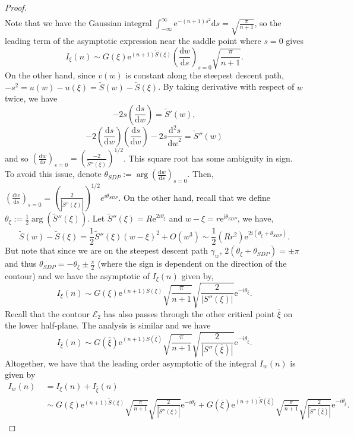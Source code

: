 \documentclass[10pt,a4paper]{amsart}
\newcommand{\ds}{{\mathrm ds}}
\newcommand{\dw}{{\mathrm dw}}
\newcommand{\tS}{{\widetilde S}}
\begin{document}
\begin{proof}
\begin{equation}
\begin{aligned}
        \end{aligned}
    \end{equation}
    Note that we have the Gaussian integral $\displaystyle \int_{-\infty}^\infty \mathrm e^{-(n+1)s^2} \ds=\sqrt{\frac{\pi}{n+1}}$, so the leading term of the asymptotic expression near the saddle point where $s=0$ gives 
    \[
    I_\xi(n) \sim G(\xi)\mathrm e^{(n+1)\tS(\xi)}\left(\frac{\mathrm dw}{\mathrm ds}\right)_{s=0} \sqrt{\frac{\pi}{n+1}}.
    \]
    On the other hand, since $v(w)$ is constant along the steepest descent path, $-s^2=u(w)-u(\xi)=\tS(w)-\tS(\xi)$. By taking derivative with respect of $w$ twice, we have 
    \[-2s\left(\frac{\ds}{\dw}\right)=\tS'(w),\]
    \[
    -2\left(\frac{\ds}{\dw}\right)\left(\frac{\ds}{\dw}\right)-2s\frac{\mathrm d^2s}{\dw^2}=\tS''(w)
    \]
    and so $\displaystyle \left(\frac{\dw}{\ds}\right)_{s=0}=\left(\frac{-2}{\tS''(\xi)}\right)^{1/2}$. 
   This square root has some ambiguity in sign. To avoid this issue, denote $\displaystyle \theta_{SDP}:=\operatorname{arg}\left(\frac{\mathrm d w}{\mathrm d s}\right)_{s=0}$. Then, 
  $ 
   \displaystyle \left(\frac{\dw}{\ds}\right)_{s=0}=\left(\frac{2}{|\tS''(\xi)|}\right)^{1/2}e^{i\theta_{SDP}}$. 
   On the other hand, recall that we define $\theta_\xi:=\frac{1}{2}\operatorname{arg}(\tS''(\xi))$. Let $\tS''(\xi)=R\mathrm e^{\mathrm 2i\theta_\xi}$ and $w-\xi=r\mathrm e^{\mathrm i \theta_{SDP}}$, we have,
   \[
     \tS(w)-\tS(\xi) = \frac{1}{2}\tS''(\xi)(w-\xi)^2 +O(w^3)\sim\frac{1}{2}(Rr^2)\mathrm e^{2i(\theta_\xi+\theta_{SDP})}.
     \]
    But note that since we are on the steepest descent path $\gamma_w$, $2(\theta_\xi+\theta_{SDP})=\pm \pi$ and thus $\theta_{SDP}=-\theta_\xi\pm\frac{\pi}{2}$ (where the sign is dependent on the direction of the contour) and we have the asymptotic of $I_\xi(n)$ given by, 
    \begin{equation}
        \label{eq: I(n) approx 3}
        I_\xi(n)\sim G(\xi)\mathrm e^{(n+1) S(\xi)}\sqrt{\frac{\pi}{n+1}}\sqrt{\frac{2}{|S''(\xi)|}}\mathrm e^{-i\theta_\xi}.
    \end{equation}
 Recall that the contour $\mathcal E_2$ has also passes through the other critical point $\bar \xi$ on the lower half-plane. The analysis is similar and we have
 \begin{equation}
        \label{eq: I(m) approx 4 conjugate}
        I_{\bar \xi}(n)\sim G(\bar \xi)\mathrm e^{(n+1)S(\bar \xi)}\sqrt{\frac{\pi}{n+1}}\sqrt{\frac{2}{|S''(\bar \xi)|}}\mathrm e^{-i\theta_{\bar \xi}}.
    \end{equation}
Altogether, we have that the leading order asymptotic of the integral $I_w(n)$ is given by
$$
\begin{aligned}
I_w(n)&\;=I_\xi(n)+I_{\bar \xi}(n)\\
&\;\sim G(\xi)\mathrm e^{(n+1) \tS(\xi)}\sqrt{\frac{\pi}{n+1}}\sqrt{\frac{2}{|\tS''(\xi)|}}\mathrm e^{-i\theta_\xi}+G(\bar \xi)\mathrm e^{(n+1) \tS(\bar \xi)}\sqrt{\frac{\pi}{n+1}}\sqrt{\frac{2}{|\tS''(\bar \xi)|}}\mathrm e^{-i\theta_{\bar \xi}}.
\end{aligned}
$$
 \end{proof}
\end{document}

